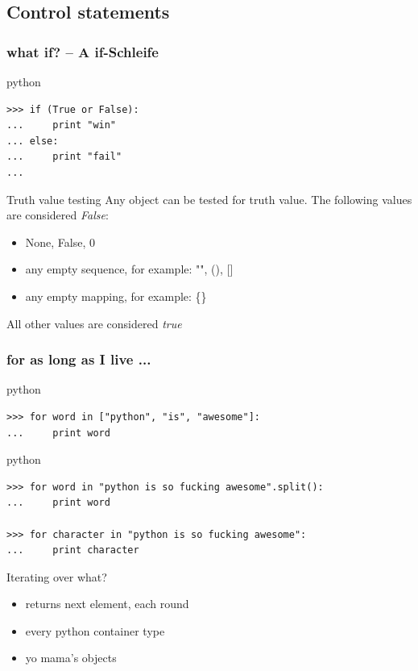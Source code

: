 \documentclass{beamer}
\begin{document}
\subsection{Control statements}
\begin{frame}[fragile]
    \frametitle{what \textbf{if}? -- A if-Schleife}
    
    \begin{exampleblock}{python}
    \begin{lstlisting}
>>> if (True or False):
...     print "win"
... else:
...     print "fail"
...
    \end{lstlisting}
    \end{exampleblock}
    
\pause

    \begin{block}{Truth value testing}
    Any object can be tested for truth value. The following values are considered \emph{False}:
    \begin{itemize}
        \item None, False, 0
        \item any empty sequence, for example: "", (), []
        \item any empty mapping, for example: \{\}
    \end{itemize}
    All other values are considered \emph{true}
    \end{block}
\end{frame}

\begin{frame}[fragile]
    \frametitle{\textbf{for} as long as I live ...}
    
    \begin{exampleblock}{python}
    \begin{lstlisting}
>>> for word in ["python", "is", "awesome"]:
...     print word
    \end{lstlisting}
    \end{exampleblock}

    \begin{exampleblock}{python}
    \begin{lstlisting}
>>> for word in "python is so fucking awesome".split():
...     print word

>>> for character in "python is so fucking awesome":
...     print character
    \end{lstlisting}
    \end{exampleblock}

	\pause

    \begin{block}{Iterating over what?}
    \begin{itemize}
    \item returns next element, each round
    \item every python container type
    \item yo mama's objects %
    \end{itemize}
    \end{block}
\end{frame}
\end{document}
